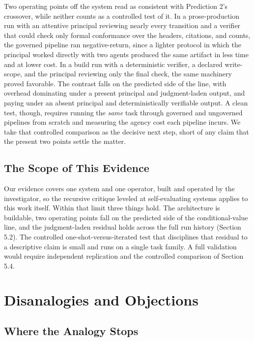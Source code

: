 \documentclass[11pt]{article}
\begin{document}
Two operating points off the system read as consistent with Prediction 2's crossover, while neither counts as a controlled test of it. In a prose-production run with an attentive principal reviewing nearly every transition and a verifier that could check only formal conformance over the headers, citations, and counts, the governed pipeline ran negative-return, since a lighter protocol in which the principal worked directly with two agents produced the same artifact in less time and at lower cost. In a build run with a deterministic verifier, a declared write-scope, and the principal reviewing only the final check, the same machinery proved favorable. The contrast falls on the predicted side of the line, with overhead dominating under a present principal and judgment-laden output, and paying under an absent principal and deterministically verifiable output. A clean test, though, requires running the \emph{same} task through governed and ungoverned pipelines from scratch and measuring the agency cost each pipeline incurs. We take that controlled comparison as the decisive next step, short of any claim that the present two points settle the matter.

\subsection{The Scope of This Evidence}

Our evidence covers one system and one operator, built and operated by the investigator, so the recursive critique leveled at self-evaluating systems applies to this work itself. Within that limit three things hold. The architecture is buildable, two operating points fall on the predicted side of the conditional-value line, and the judgment-laden residual holds across the full run history (Section 5.2). The controlled one-shot-versus-iterated test that disciplines that residual to a descriptive claim is small and runs on a single task family. A full validation would require independent replication and the controlled comparison of Section 5.4.

\section{Disanalogies and Objections}

\subsection{Where the Analogy Stops}
\end{document}
